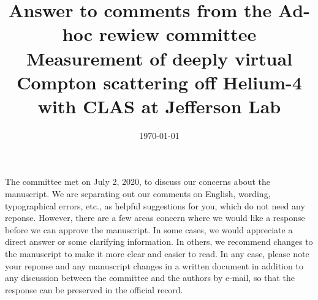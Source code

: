 \documentclass[a4paper,11pt,twoside]{article}
\title{Answer to comments from the Ad-hoc rewiew committee \\
 Measurement of deeply virtual Compton
scattering off Helium-4 with CLAS at Jefferson Lab}
\date{\today}
\begin{document}
\maketitle

\section*{}

The committee met on July 2, 2020, to discuss our concerns about the manuscript. We are separating out
our comments on English, wording, typographical errors, etc., as helpful suggestions for you, which do not need
any reponse. However, there are a few areas concern where we would like a response before we can approve the
manuscript. In some cases, we would appreciate a direct answer or some clarifying information. In others, we
recommend changes to the manuscript to make it more clear and easier to read. In any case, please note your
reponse and any manuscript changes in a written document in addition to any discussion between the committee
and the authors by e-mail, so that the response can be preserved in the official record.
\end{document}
